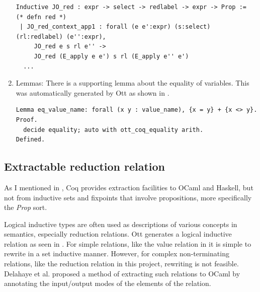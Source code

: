 \documentclass[12pt,twoside,notitlepage]{report}
\theoremstyle{plain}%
\theoremstyle{definition}
\theoremstyle{remark}
\begin{document}
\begin{enumerate}
{\begin{minipage}{\linewidth}

\begin{lstlisting}[language={Coq},caption={Coq reduction relation example}, label={lst:coqlogind}]
Inductive JO_red : expr -> select -> redlabel -> expr -> Prop :=    (* defn red *)
 | JO_red_context_app1 : forall (e e':expr) (s:select) (rl:redlabel) (e'':expr),
     JO_red e s rl e'' ->
     JO_red (E_apply e e') s rl (E_apply e'' e')
  ...
\end{lstlisting}

\end{minipage}	
}
\item{Lemmas: There is a supporting lemma about the equality of variables. This was automatically generated by Ott as shown in .
\begin{minipage}{\linewidth}

\begin{lstlisting}[language={Coq},caption={Coq variable equality lemma}, label={lst:coqeqlabel}]
Lemma eq_value_name: forall (x y : value_name), {x = y} + {x <> y}.
Proof.
  decide equality; auto with ott_coq_equality arith.
Defined.
\end{lstlisting}

\end{minipage}	

}
\end{enumerate} 
\subsection{Extractable reduction relation}
As I mentioned in , Coq provides extraction facilities to OCaml and Haskell, but not from inductive sets and fixpoints that involve propositions, more specifically the \textit{Prop} sort. 

Logical inductive types are often used as descriptions of various concepts in semantics, especially reduction relations. Ott generates a logical inductive relation as seen in . For simple relations, like the value relation in  it is simple to rewrite in a set inductive manner. However, for complex non-terminating relations, like the reduction relation in this project, rewriting is not feasible.  Delahaye et al.\cite{delahaye2007extracting,tollitte2012producing} proposed a method of extracting such relations to OCaml by annotating the input/output modes of the elements of the relation. \label{sec:extractable_plugin_descr}
\end{document}
